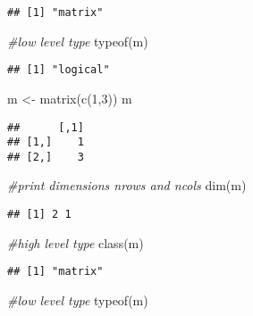 \documentclass[
]{article}
\newenvironment{Shaded}{\begin{snugshade}}{\end{snugshade}}
\newcommand{\CommentTok}[1]{\textcolor[rgb]{0.56,0.35,0.01}{\textit{#1}}}
\newcommand{\DecValTok}[1]{\textcolor[rgb]{0.00,0.00,0.81}{#1}}
\newcommand{\FunctionTok}[1]{\textcolor[rgb]{0.00,0.00,0.00}{#1}}
\newcommand{\NormalTok}[1]{#1}
\newcommand{\OtherTok}[1]{\textcolor[rgb]{0.56,0.35,0.01}{#1}}
\begin{document}
\begin{verbatim}
## [1] "matrix"
\end{verbatim}

\begin{Shaded}
\begin{Highlighting}[]
\CommentTok{\#low level type}
\FunctionTok{typeof}\NormalTok{(m)}
\end{Highlighting}
\end{Shaded}

\begin{verbatim}
## [1] "logical"
\end{verbatim}

\begin{Shaded}
\begin{Highlighting}[]
\NormalTok{m }\OtherTok{\textless{}{-}} \FunctionTok{matrix}\NormalTok{(}\FunctionTok{c}\NormalTok{(}\DecValTok{1}\NormalTok{,}\DecValTok{3}\NormalTok{))}
\NormalTok{m}
\end{Highlighting}
\end{Shaded}

\begin{verbatim}
##      [,1]
## [1,]    1
## [2,]    3
\end{verbatim}

\begin{Shaded}
\begin{Highlighting}[]
\CommentTok{\#print dimensions nrows and ncols}
\FunctionTok{dim}\NormalTok{(m)}
\end{Highlighting}
\end{Shaded}

\begin{verbatim}
## [1] 2 1
\end{verbatim}

\begin{Shaded}
\begin{Highlighting}[]
\CommentTok{\#high level type}
\FunctionTok{class}\NormalTok{(m)}
\end{Highlighting}
\end{Shaded}

\begin{verbatim}
## [1] "matrix"
\end{verbatim}

\begin{Shaded}
\begin{Highlighting}[]
\CommentTok{\#low level type}
\FunctionTok{typeof}\NormalTok{(m)}
\end{Highlighting}
\end{Shaded}
\end{document}
